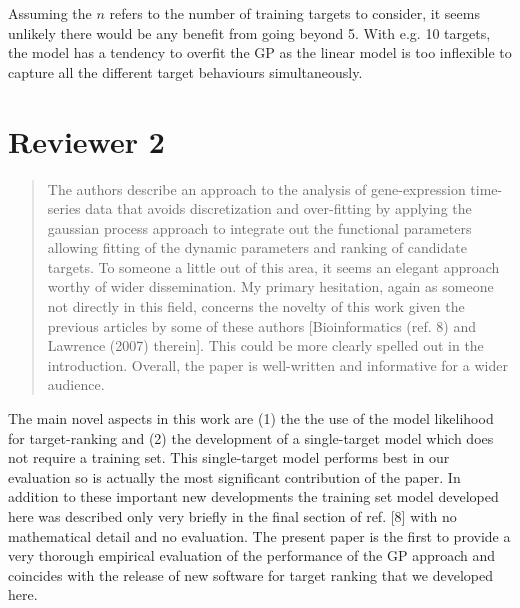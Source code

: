 \documentclass{article}
\begin{document}
  Assuming the $n$ refers to the number of training targets to
  consider, it seems unlikely there would be any benefit from going
  beyond 5.  With e.g. 10 targets, the model has a tendency to overfit
  the GP as the linear model is too inflexible to capture all the
  different target behaviours simultaneously.



\newpage

\section*{Reviewer 2}

\begin{quote} The authors describe an approach to the analysis
    of gene-expression time-series data that avoids discretization and
    over-fitting by applying the gaussian process approach to
    integrate out the functional parameters allowing fitting of the
    dynamic parameters and ranking of candidate targets. To someone a
    little out of this area, it seems an elegant approach worthy of
    wider dissemination. My primary hesitation, again as someone not
    directly in this field, concerns the novelty of this work given
    the previous articles by some of these authors [Bioinformatics
    (ref. 8) and Lawrence (2007) therein]. This could be more clearly
    spelled out in the introduction. Overall, the paper is
    well-written and informative for a wider audience.
\end{quote}

The main novel aspects in this work are (1) the the use of the model likelihood
for target-ranking and (2) the development of a single-target model which
does not require a training set. This single-target model performs
best in our evaluation so is actually the most significant
contribution of the paper. In addition to these important new
developments the training set model developed here was described only
very briefly in the final section of ref. [8] with no
mathematical detail and no evaluation. The present paper is the first to
provide a very thorough empirical evaluation of the performance of the
GP approach and coincides with the release of new software for
target ranking that we developed here. 
\end{document}
